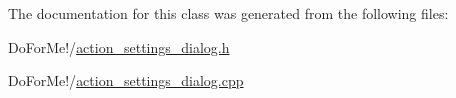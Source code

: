 The documentation for this class was generated from the following files\-:\begin{DoxyCompactItemize}
\item 
Do\-For\-Me!/\hyperlink{action__settings__dialog_8h}{action\-\_\-settings\-\_\-dialog.\-h}\item 
Do\-For\-Me!/\hyperlink{action__settings__dialog_8cpp}{action\-\_\-settings\-\_\-dialog.\-cpp}\end{DoxyCompactItemize}
